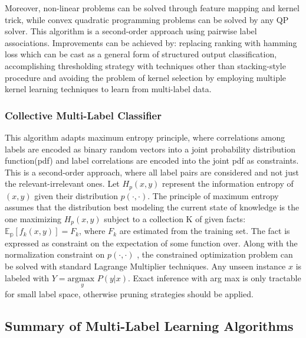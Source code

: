 \documentclass[12pt]{report}
\begin{document}
	Moreover, non-linear problems can be solved through feature mapping and kernel trick, while convex quadratic programming problems can be solved by any QP solver. This algorithm is a second-order approach using pairwise label associations. Improvements can be achieved by: replacing ranking with hamming loss which can be cast as a general form of	structured output classification, accomplishing thresholding strategy with techniques other than stacking-style procedure and avoiding the problem of kernel selection by employing multiple kernel learning techniques to learn from multi-label data.
	
	 \subsubsection*{Collective Multi-Label Classifier}
	 This algorithm adapts maximum entropy principle, where correlations among labels are encoded as binary random vectors into a joint probability distribution function(pdf) and label correlations are encoded into the joint pdf as constraints. This is a second-order approach, where all label pairs are considered and not just the relevant-irrelevant ones. Let $H_p(x, y)$ represent the information entropy of $(x,y)$ given their distribution $p(\cdot , \cdot)$. The principle of maximum entropy assumes that the distribution best modeling the current state of knowledge is the one maximizing $H_p(x, y)$ subject to a collection K of given facts: $\mathbb{E_p}[f_k(x,y)] = F_k$, where $F_k$ are estimated from the training set. The fact is expressed as constraint on the expectation of  some  function  over. Along with the normalization constraint on $p(\cdot , \cdot)$ , the constrained optimization problem can be solved with standard Lagrange Multiplier techniques. Any unseen instance $x$ is labeled with $Y = \underset{y}{\text{argmax }} P(y | x)$. Exact inference with arg max is only tractable for small label space, otherwise pruning strategies should be applied.
	 
	 \subsection*{Summary of Multi-Label Learning Algorithms}
	 
\end{document}
